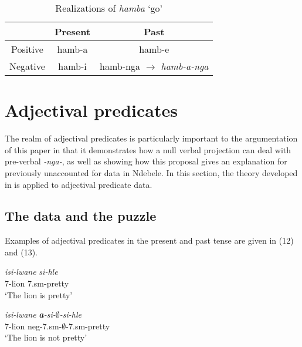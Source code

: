 \documentclass[output=paper]{langsci/langscibook}
\begin{document}
\begin{table}
\caption{Realizations of \textit{hamba} `go'} %
\centering %
\begin{tabular}{|c|c|c|} %
\hline%
 & Present & Past\\ [0.5ex] 
\hline %
Positive & hamb-a  & hamb-e  \\ %
Negative & hamb-i & hamb-nga $\longrightarrow$ \textit{hamb-a-nga}\\[1ex] %
\hline %
\end{tabular} 
\label{tab:hresult} 
\end{table} 





\section{Adjectival predicates}

The realm of adjectival predicates is particularly important to the argumentation of this paper in that it demonstrates how a null verbal projection can deal with pre-verbal \textit{-nga-}, as well as showing how this proposal gives an explanation for previously unaccounted for data in Ndebele. In this section, the theory developed in  is applied to adjectival predicate data.

\subsection{The data and the puzzle}

Examples of adjectival predicates in the present and past tense are given in (12) and (13).

\begin{exe}
\ex \begin{xlist}
\ex \gll \textit{isi-lwane} \textit{si-hle}\\
       7-lion 7.{\sc sm}-pretty\\
    \glt `The lion is pretty' 

\ex \gll \textit{isi-lwane} \textit{\textbf{a}-si-$\emptyset$-si-hle}\\
       7-lion {\sc neg}-7.{\sc sm}-$\emptyset$-7.{\sc sm}-pretty\\
    \glt `The lion is not pretty' 
\end{xlist}
\end{exe}
\end{document}
